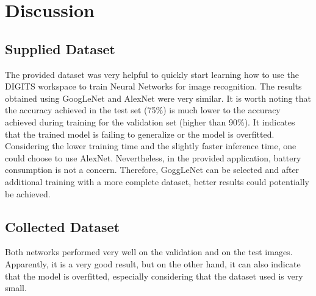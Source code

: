 \documentclass[10pt,journal,compsoc]{IEEEtran}
\begin{document}
\section{Discussion} 
\label{discussion}
\subsection{Supplied Dataset}

The provided dataset was very helpful to quickly start learning how to use the DIGITS workspace to train Neural Networks for image recognition.
The results obtained using GoogLeNet and AlexNet were very similar. It is worth noting that the accuracy achieved in the test set (75\%) is much lower to the accuracy achieved during training for the validation set (higher than 90\%). It indicates that the trained model is failing to generalize or the model is overfitted.
Considering the lower training time and the slightly faster inference time, one could choose to use AlexNet. Nevertheless, in the provided application, battery consumption is not a concern. Therefore, GoggLeNet can be selected and after additional training with a more complete dataset, better results could potentially be achieved. 

\subsection{Collected Dataset}

Both networks performed very well on the validation and on the test images. Apparently, it is a very good result, but on the other hand, it can also indicate that the model is overfitted, especially considering that the dataset used is very small.
 
\end{document}
